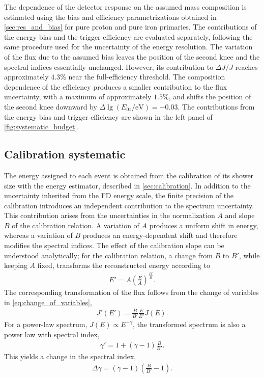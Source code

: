 \documentclass[main.tex]{subfiles}
\begin{document}
The dependence of the detector response on the assumed mass composition is estimated using the bias and efficiency parametrizations obtained in \cref{sec:res_and_bias} for pure proton and pure iron primaries.
The contributions of the energy bias and the trigger efficiency are evaluated separately, following the same procedure used for the uncertainty of the energy resolution.
%
The variation of the flux due to the assumed bias leaves the position of the second knee and the spectral indices essentially unchanged.
However, its contribution to $\Delta J/J$ reaches approximately $4.3\%$ near the full-efficiency threshold.
The composition dependence of the efficiency produces a smaller contribution to the flux uncertainty, with a maximum of approximately $1.5\%$, and shifts the position of the second knee downward by
$\Delta\lg(E_{01}/\mathrm{eV})=-0.03$.
%
The contributions from the energy bias and trigger efficiency are shown in the left panel of \cref{fig:systematic_budget}.

\subsection{Calibration systematic}
\label{subsec:calibration_systematic}

The energy assigned to each  event is obtained from the calibration of its shower size with the  energy estimator, described in \cref{sec:calibration}.
In addition to the uncertainty inherited from the FD energy scale, the finite precision of the calibration introduces an independent contribution to the spectrum uncertainty.
This contribution arises from the uncertainties in the normalization $A$ and slope $B$ of the calibration relation.
A variation of $A$ produces a uniform shift in energy, whereas a variation of $B$ produces an energy-dependent shift and therefore modifies the spectral indices.
%
The effect of the calibration slope can be understood analytically; for the calibration relation, a change from $B$ to $B'$, while keeping $A$ fixed, transforms the reconstructed energy according to
\begin{align}
    E'
    =
    A
    \left(\frac{E}{A}\right)^{\frac{B'}{B}}.
    \label{eq:calibration_energy_transformation}
\end{align}
The corresponding transformation of the flux follows from the change of variables in \cref{eq:change_of_variables},
\begin{align}
    J'(E')
    =
    \frac{B}{B'}
    \frac{E}{E'}
    J(E).
    \label{eq:calibration_flux_transformation}
\end{align}
For a power-law spectrum, $J(E)\propto E^{-\gamma}$, the transformed spectrum is also a power law with spectral index,
\begin{align}
    \gamma'
    =
    1+(\gamma-1)\frac{B}{B'}.
    \label{eq:calibration_spectral_index}
\end{align}
This yields a change in the spectral index,
\begin{align}
    \Delta\gamma
    =
    (\gamma-1)
    \left(\frac{B}{B'}-1\right).
    \label{eq:calibration_spectral_index_change}
\end{align}
\end{document}
